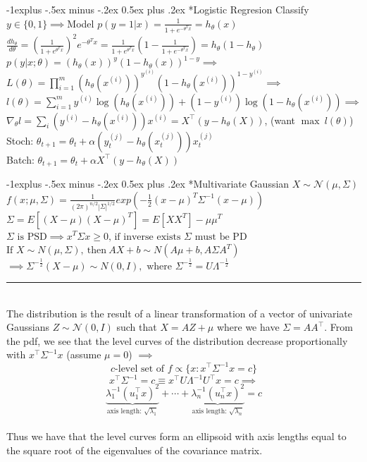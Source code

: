 \documentclass[3pt,landscape]{article}
\makeatletter
\renewcommand{\subsection}{\@startsection{subsection}{2}{0mm}%
                            {-1explus -.5ex minus -.2ex}%
                            {0.5ex plus .2ex}%
                            {\normalfont\normalsize\bfseries}}
\makeatother
\begin{document}
\begin{multicols}{3}
\subsection*{Logistic Regresion}
Classify $y \in \{0,1\} \implies$Model $p(y=1|x) = \frac{1}{1+e^{-\theta^T x}}= h_\theta(x)$\\
$\frac{dh_\theta}{d\theta} = (\frac{1}{1 + e^{\theta^Tx}})^2 e^{-\theta^Tx} = \frac{1}{1 + e^{\theta^Tx}}\left(1-\frac{1}{1+e^{-\theta^Tx}}\right) = h_\theta(1-h_\theta)$
\(p(y|x;\theta) = (h_\theta(x))^y(1-h_\theta(x))^{1-y} \implies\)
\(L(\theta)  = \prod_{i=1}^m (h_\theta(x^{(i)}))^{y^{(i)}}(1-h_\theta(x^{(i)}))^{1-y^{(i)}} \implies \)
\(l(\theta) = \sum_{i=1}^m y^{(i)} \log(h_\theta(x^{(i)})) + (1-y^{(i)})\log(1-h_\theta(x^{(i)})) \implies\)
\(\nabla_\theta l = \sum_i (y^{(i)} - h_\theta(x^{(i)}))x^{(i)} = X^\intercal (y-h_\theta(X))\),  (want $\max \ l(\theta)$)
Stoch: $\boxed{\theta_{t+1} = \theta_t + \alpha(y^{(j)}_t - h_\theta(x^{(j)}_t))x^{(j)}_t}$\\
Batch: $\boxed{\theta_{t+1} = \theta_t + \alpha X^\intercal(y-h_\theta(X))}$

\subsection*{Multivariate Gaussian $X \sim \mathcal{N}(\mu,\Sigma)$}
\(f(x;\mu,\Sigma)=\frac{1}{(2\pi)^{n/2}|\Sigma|^{1/2}}exp\left(-\frac{1}{2}(x-\mu)^T \Sigma^{-1}(x-\mu)\right)\)
\(\Sigma=E[(X-\mu)(X-\mu)^T]=E[XX^T]-\mu\mu^T\)
\(\Sigma \text{ is PSD} \implies x^T\Sigma x \ge 0 \text{, if inverse exists }\Sigma \text{ must be PD}\)
\(\text{If } X\sim N(\mu,\Sigma),\ \text{then}\ AX+b\sim N(A\mu+b,A\Sigma A^T)\)\\
\(\implies \Sigma^{-\frac{1}{2}}(X-\mu)\sim N(0,I), \text{ where } \Sigma^{-\frac{1}{2}}=U\Lambda^{-\frac{1}{2}}\)\\
\rule{1\linewidth}{0.1pt}\\
The distribution is the result of a linear transformation of a vector of univariate Gaussians $Z \sim \mathcal{N}(0,I)$ such that $X = AZ + \mu$ where we have $\Sigma = AA^\intercal$. From the pdf, we see that the level curves of the distribution decrease proportionally with $x^\intercal\Sigma^{-1}x$ (assume $\mu = 0$) $\implies$ \[\text{$c$-level set of $f$} \propto \{x:x^\intercal\Sigma^{-1}x = c\}\]
\[x^\intercal\Sigma^{-1} = c \equiv x^\intercal U\Lambda^{-1}U^\intercal x = c \implies\]
\[\underbrace{\lambda_1^{-1}(u_1^\intercal x)^2}_\text{axis length: $\sqrt{\lambda_1}$} + \cdots +\underbrace{\lambda_n^{-1}(u_n^\intercal x)^2}_\text{axis length: $\sqrt{\lambda_n}$} = c\]\\
Thus we have that the level curves form an ellipsoid with axis lengths equal to the square root of the eigenvalues of the covariance matrix.


\end{multicols}
\end{document}
